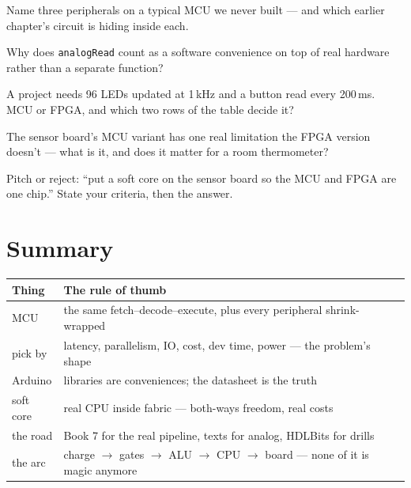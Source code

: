 \begin{exercise}[easy]
Name three peripherals on a typical MCU we never built --- and
which earlier chapter's circuit is hiding inside each.
\end{exercise}
\begin{exercise}[easy]
Why does \texttt{analogRead} count as a software convenience on
top of real hardware rather than a separate function?
\end{exercise}
\begin{exercise}[medium]
A project needs 96 LEDs updated at 1\,kHz and a button read every
200\,ms. MCU or FPGA, and which two rows of the table decide it?
\end{exercise}
\begin{exercise}[medium]
The sensor board's MCU variant has one real limitation the FPGA
version doesn't --- what is it, and does it matter for a room
thermometer?
\end{exercise}
\begin{exercise}[hard]
Pitch or reject: ``put a soft core on the sensor board so the MCU
and FPGA are one chip.'' State your criteria, then the answer.
\end{exercise}

\section{Summary}\label{sec:sum19}

\begin{center}
\begin{tabularx}{\linewidth}{@{}lX@{}}
\toprule
\textbf{Thing} & \textbf{The rule of thumb}\\
\midrule
MCU & the same fetch--decode--execute, plus every peripheral
shrink-wrapped\\
pick by & latency, parallelism, I\/O, cost, dev time, power ---
the problem's shape\\
Arduino & libraries are conveniences; the datasheet is the truth\\
soft core & real CPU inside fabric --- both-ways freedom, real
costs\\
the road & Book 7 for the real pipeline, texts for analog, HDLBits
for drills\\
the arc & charge $\to$ gates $\to$ ALU $\to$ CPU $\to$ board ---
none of it is magic anymore\\
\bottomrule
\end{tabularx}
\end{center}

